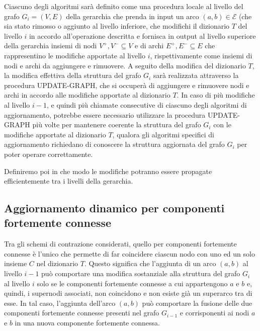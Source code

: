 Ciascuno degli algoritmi sar\`a definito come una procedura locale al livello del grafo $G_i = (V, E)$ della gerarchia
che prenda in input un arco $(a, b) \in \mathcal{E}$ (che sia stato rimosso o aggiunto al livello inferiore, che modifichi
il dizionario $T$ del livello $i$ in accordo all'operazione descritta e fornisca in output al livello superiore della
gerarchia insiemi di nodi $V^+, V^- \subseteq V$ e di archi $E^+,E^- \subseteq E$ che rappresentino le modifiche
apportate al livello $i$, rispettivamente come insiemi di nodi e archi da aggiungere e rimuovere. \newline
A seguito della modifica del dizionario $T$, la modifica effettiva della struttura del grafo $G_i$ sar\`a realizzata
attraverso la procedura UPDATE-GRAPH, che si occuper\`a di aggiungere e rimuovere nodi e archi in accordo alle modifiche
apportate al dizionario $T$. \newline
In caso di pi\`u modifiche al livello $i-1$, e quindi pi\`u chiamate consecutive di ciascuno degli algoritmi di
aggiornamento, potrebbe essere necessario utilizzare la procedura UPDATE-GRAPH pi\`u volte per mantenere coerente la
struttura del grafo $G_i$ con le modifiche apportate al dizionario $T$, qualora gli algoritmi specifici di aggiornamento
richiedano di conoscere la struttura aggiornata del grafo $G_i$ per poter operare correttamente.

Definiremo poi in che modo le modifiche potranno essere propagate efficientemente tra i livelli della gerarchia.


\subsection{Aggiornamento dinamico per componenti fortemente connesse}
\label{subsec:aggiornamento-dinamico-per-componenti-fortemente-connesse}

Tra gli schemi di contrazione considerati, quello per componenti fortemente connesse \`e l'unico che permette
di far coincidere ciascun nodo con uno ed un solo insieme $C$ nel dizionario $T$.
Questo significa che l'aggiunta di un arco $(a, b)$ al livello $i-1$ pu\`o comportare una modifica sostanziale alla
struttura del grafo $G_i$ al livello $i$ solo se le componenti fortemente connesse a cui appartengono $a$ e $b$ e,
quindi, i supernodi associati, non coincidono e non esiste gi\`a un superarco tra di esse. \newline
In tal caso, l'aggiunta dell'arco $(a, b)$ pu\`o comportare la fusione delle due componenti fortemente connesse
presenti nel grafo $G_{i-1}$ e corrisponenti ai nodi $a$ e $b$ in una nuova componente fortemente connessa.

